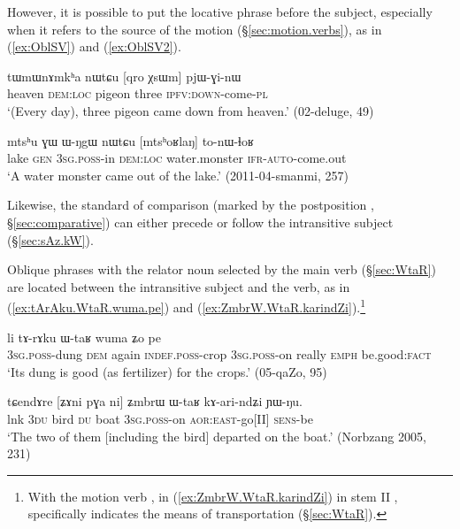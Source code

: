 However, it is possible to put the locative phrase before the subject, especially when it refers to the source of the motion (§\ref{sec:motion.verbs}), as in (\ref{ex:OblSV}) and (\ref{ex:OblSV2}).

\begin{exe}
\ex \label{ex:OblSV}
\gll tɯmɯnɤmkʰa nɯtɕu [qro χsɯm] pjɯ-ɣi-nɯ \\
heaven \textsc{dem}:\textsc{loc} pigeon three \textsc{ipfv}:\textsc{down}-come-\textsc{pl} \\
\glt `(Every day), three pigeon came down from heaven.' (02-deluge, 49)
\end{exe}

\begin{exe}
\ex \label{ex:OblSV2}
\gll mtsʰu ɣɯ ɯ-ŋgɯ nɯtɕu [mtsʰoʁlaŋ] to-nɯ-ɬoʁ  \\
lake \textsc{gen} \textsc{3sg}.\textsc{poss}-in \textsc{dem}:\textsc{loc} water.monster \textsc{ifr}-\textsc{auto}-come.out \\
\glt `A water monster came out of the lake.' (2011-04-smanmi, 257)
\end{exe}

Likewise, the standard of comparison (marked by the postposition , §\ref{sec:comparative}) can either precede or follow the intransitive subject (§\ref{sec:sAz.kW}).

Oblique phrases with the relator noun  selected by the main verb (§\ref{sec:WtaR}) are located between the intransitive subject and the verb, as in (\ref{ex:tArAku.WtaR.wuma.pe}) and (\ref{ex:ZmbrW.WtaR.karindZi}).\footnote{
With the motion verb , in (\ref{ex:ZmbrW.WtaR.karindZi}) in stem II ,  specifically indicates the means of transportation (§\ref{sec:WtaR}). }

\begin{exe}
\ex \label{ex:tArAku.WtaR.wuma.pe}
\gll  [ɯ-ɣli nɯ] li tɤ-rɤku ɯ-taʁ wuma ʑo pe \\
\textsc{3sg}.\textsc{poss}-dung \textsc{dem} again \textsc{indef}.\textsc{poss}-crop \textsc{3sg}.\textsc{poss}-on really \textsc{emph} be.good:\textsc{fact} \\
\glt `Its dung is good (as fertilizer) for the crops.' (05-qaZo, 95)
\end{exe}

\begin{exe}
\ex \label{ex:ZmbrW.WtaR.karindZi}
\gll tɕendɤre [ʑɤni pɣa ni] ʑmbrɯ ɯ-taʁ kɤ-ari-ndʑi ɲɯ-ŋu. \\
lnk \textsc{3du} bird \textsc{du} boat \textsc{3sg}.\textsc{poss}-on \textsc{aor}:\textsc{east}-go[II] \textsc{sens}-be \\
\glt `The two of them [including the bird] departed on the boat.' (Norbzang 2005, 231)
\end{exe} 

